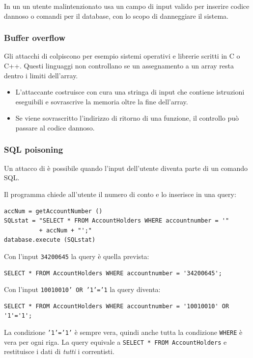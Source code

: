 \begin{definizione}
In un  un utente malintenzionato usa un campo di input valido per inserire codice dannoso o
comandi per il database, con lo scopo di danneggiare il sistema.
\end{definizione}

\subsubsection{Buffer overflow}
Gli attacchi di  colpiscono per esempio sistemi operativi e librerie scritti in C o C++.
Questi linguaggi non controllano se un assegnamento a un array resta dentro i limiti dell'array.
\begin{itemize}
  \item L'attaccante costruisce con cura una stringa di input che contiene istruzioni eseguibili e sovrascrive la
    memoria oltre la fine dell'array.
  \item Se viene sovrascritto l'indirizzo di ritorno di una funzione, il controllo può passare al codice dannoso.
\end{itemize}

\subsubsection{SQL poisoning}
Un attacco di  è possibile quando l'input dell'utente diventa parte di un comando SQL.

\begin{esempio}
Il programma chiede all'utente il numero di conto e lo inserisce in una query:
\begin{verbatim}
accNum = getAccountNumber ()
SQLstat = "SELECT * FROM AccountHolders WHERE accountnumber = '"
          + accNum + "';"
database.execute (SQLstat)
\end{verbatim}
Con l'input \texttt{34200645} la query è quella prevista:
\begin{verbatim}
SELECT * FROM AccountHolders WHERE accountnumber = '34200645';
\end{verbatim}
Con l'input \texttt{10010010' OR '1'='1} la query diventa:
\begin{verbatim}
SELECT * FROM AccountHolders WHERE accountnumber = '10010010' OR '1'='1';
\end{verbatim}
La condizione \texttt{'1'='1'} è sempre vera, quindi anche tutta la condizione \texttt{WHERE} è vera per ogni riga. La
query equivale a \texttt{SELECT * FROM AccountHolders} e restituisce i dati di \emph{tutti} i correntisti.
\end{esempio}

